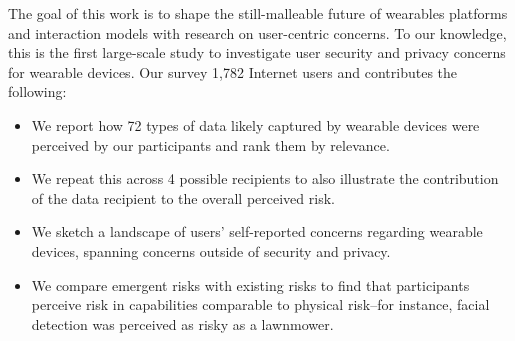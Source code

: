 The goal of this work is to shape the still-malleable future of wearables platforms and interaction models with research on user-centric concerns. To our knowledge, this is the first large-scale study to investigate user security and privacy concerns for wearable devices. Our survey 1,782 Internet users and contributes the following: %

\begin{itemize} \itemsep1pt \parskip0pt 
\item We report how 72 types of data likely captured by wearable devices were perceived by our participants and rank them by relevance. 
\item We repeat this across 4 possible recipients to also illustrate the contribution of the data recipient to the overall perceived risk. 
\item We sketch a landscape of users' self-reported concerns regarding wearable devices, spanning concerns outside of security and privacy. 
\item We compare emergent risks with existing risks to find that participants perceive risk in capabilities comparable to physical risk--for instance, facial detection was perceived as risky as a lawnmower.
\end{itemize}
